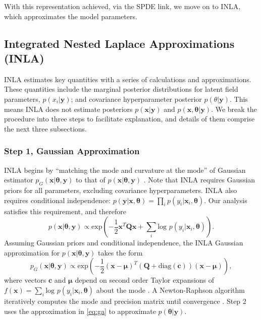 With this representation achieved, via the SPDE link, we move on to INLA, which approximates the model parameters.

\subsection{Integrated Nested Laplace Approximations (INLA)}

INLA estimates key quantities with a series of calculations and approximations. These quantities include the marginal posterior distributions for latent field parameters, $p(x_{i}|\pmb{y})$; and covariance hyperparameter posterior $p(\theta|\pmb{y})$. This means INLA does not estimate posteriors $p(\pmb{x}|\pmb{y})$ and $p(\pmb{x},\pmb{\theta}|\pmb{y})$. We break the procedure into three steps to facilitate explanation, and details of them comprise the next three subsections.

\subsubsection{Step 1, Gaussian Approximation} %

INLA begins by ``matching the mode and curvature at the mode'' of Gaussian estimator $p_{G}(\pmb{x}|\pmb{\theta}, \pmb{y})$ to that of $p(\pmb{x}|\pmb{\theta}, \pmb{y})$ \citep{Rue2005}. Note that INLA requires Gaussian priors for all parameters, excluding covariance hyperparameters. INLA also requires conditional independence: $p(\pmb{y}|\pmb{x}, \pmb{\theta}) = \prod_{i} p(y_{i}|\pmb{x}_{i},\pmb{\theta})$. Our analysis satisfies this requirement, and therefore $$p(\pmb{x}|\pmb{\theta},\pmb{y}) \propto \text{exp}\left(-\frac{1}{2}\pmb{x}^{T}\pmb{Q x} + \sum_{i} \text{log }p(y_{i}|\pmb{x}_{i},\pmb{\theta}) \right).$$ Assuming Gaussian priors and conditional independence, the INLA Gaussian approximation for $p(\pmb{x}|\pmb{\theta}, \pmb{y})$ takes the form
\begin{equation} \label{eq:ga}
p_{G}(\pmb{x}|\pmb{\theta},\pmb{y}) \propto \text{exp} \left( -\frac{1}{2}(\pmb{x-\mu})^{T} (\pmb{Q} + \text{diag}(\pmb{c}) ) (\pmb{x - \mu}) \right),
\end{equation}
where vectors $\pmb{c}$ and $\pmb{\mu}$ depend on second order Taylor expansions of $f(\pmb{x}) = \sum_{i} \text{log }p(y_{i}|\pmb{x}_{i},\pmb{\theta})$ about the mode \citep{Lindstrom2014}. A Newton-Raphson algorithm iteratively computes the mode and precision matrix until convergence \citep{Rue2009}. Step 2 uses the approximation in \ref{eq:ga} to approximate $p(\pmb{\theta}|\pmb{y})$.

